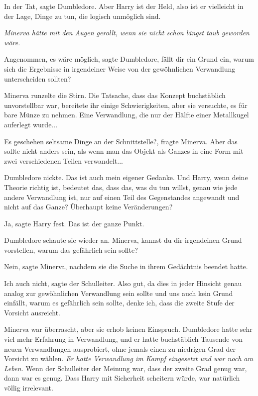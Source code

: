 \glqq{}In der Tat\grqq{}, sagte Dumbledore. \glqq{}Aber Harry ist der Held, also
ist er vielleicht in der Lage, Dinge zu tun, die logisch unmöglich sind.\grqq{}

\emph{Minerva hätte mit den Augen gerollt, wenn sie nicht schon längst taub
geworden wäre.}

\glqq{}Angenommen, es wäre möglich\grqq{}, sagte Dumbledore, \glqq{}fällt dir
ein Grund ein, warum sich die Ergebnisse in irgendeiner Weise von der
gewöhnlichen Verwandlung unterscheiden sollten?\grqq{}

Minerva runzelte die Stirn. Die Tatsache, dass das Konzept buchstäblich
unvorstellbar war, bereitete ihr einige Schwierigkeiten, aber sie versuchte, es
für bare Münze zu nehmen. Eine Verwandlung, die nur der Hälfte einer Metallkugel
auferlegt wurde...

\glqq{}Es geschehen seltsame Dinge an der Schnittstelle?\grqq{}, fragte Minerva.
\glqq{}Aber das sollte nicht anders sein, als wenn man das Objekt als Ganzes in
eine Form mit zwei verschiedenen Teilen verwandelt...\grqq{}

Dumbledore nickte. \glqq{}Das ist auch mein eigener Gedanke. Und Harry, wenn
deine Theorie richtig ist, bedeutet das, dass das, was du tun willst, genau wie
jede andere Verwandlung ist, nur auf einen Teil des Gegenstandes angewandt und
nicht auf das Ganze? Überhaupt keine Veränderungen?\grqq{}

\glqq{}Ja\grqq{}, sagte Harry fest. \glqq{}Das ist der ganze Punkt.\grqq{}

Dumbledore schaute sie wieder an. \glqq{}Minerva, kannst du dir irgendeinen
Grund vorstellen, warum das gefährlich sein sollte?\grqq{}

\glqq{}Nein\grqq{}, sagte Minerva, nachdem sie die Suche in ihrem Gedächtnis
beendet hatte.

\glqq{}Ich auch nicht\grqq{}, sagte der Schulleiter. \glqq{}Also gut, da dies in
jeder Hinsicht genau analog zur gewöhnlichen Verwandlung sein sollte und uns
auch kein Grund einfällt, warum es gefährlich sein sollte, denke ich, dass die
zweite Stufe der Vorsicht ausreicht.\grqq{}

Minerva war überrascht, aber sie erhob keinen Einspruch. Dumbledore hatte sehr
viel mehr Erfahrung in Verwandlung, und er hatte buchstäblich Tausende von neuen
Verwandlungen ausprobiert, ohne jemals einen zu niedrigen Grad der Vorsicht zu
wählen. \emph{Er hatte Verwandlung im Kampf eingesetzt und war noch am Leben.}
Wenn der Schulleiter der Meinung war, dass der zweite Grad genug war, dann war
es genug. Dass Harry mit Sicherheit scheitern würde, war natürlich völlig
irrelevant.

